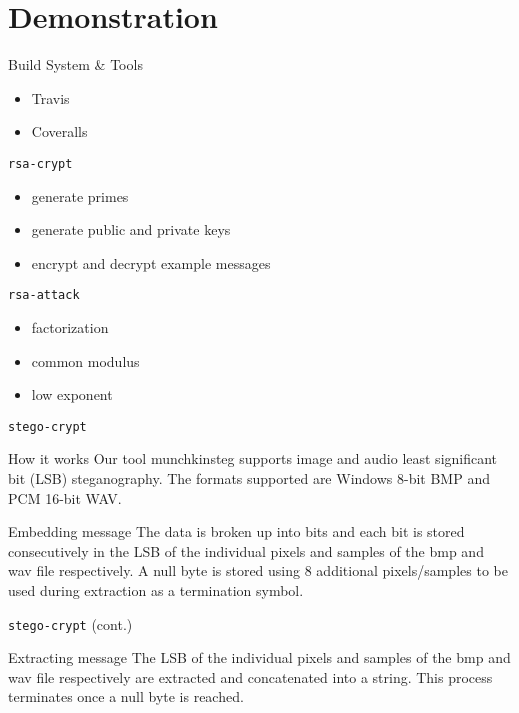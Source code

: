 \documentclass[presentation]{beamer}
\begin{document}
\section{Demonstration}
\label{sec:orgheadline1}
\begin{frame}[label=sec-3-1]{Build System \& Tools}
\begin{itemize}
\item Travis
\item Coveralls
\end{itemize}
\end{frame}
\begin{frame}[fragile,label=sec-3-2]{\texttt{rsa-crypt}}
 \begin{itemize}
\item generate primes
\item generate public and private keys
\item encrypt and decrypt example messages
\end{itemize}
\end{frame}
\begin{frame}[fragile,label=sec-3-3]{\texttt{rsa-attack}}
 \begin{itemize}
\item factorization
\item common modulus
\item low exponent
\end{itemize}
\end{frame}
\begin{frame}[fragile,label=sec-3-4]{\texttt{stego-crypt}}
 \begin{block}{How it works}
Our tool munchkinsteg supports image and audio least significant bit (LSB)
steganography. The formats supported are Windows 8-bit BMP and PCM 16-bit WAV.
\end{block}
\begin{block}{Embedding message}
The data is broken up into bits and each bit is stored consecutively in the LSB
of the individual pixels and samples of the bmp and wav file respectively. A
null byte is stored using 8 additional pixels/samples to be used during
extraction as a termination symbol.
\end{block}
\end{frame}
\begin{frame}[fragile,label=sec-3-5]{\texttt{stego-crypt} (cont.)}
 \begin{block}{Extracting message}
The LSB of the individual pixels and samples of the bmp and wav file
respectively are extracted and concatenated into a string. This process
terminates once a null byte is reached.
\end{block}
\end{frame}
\end{document}
